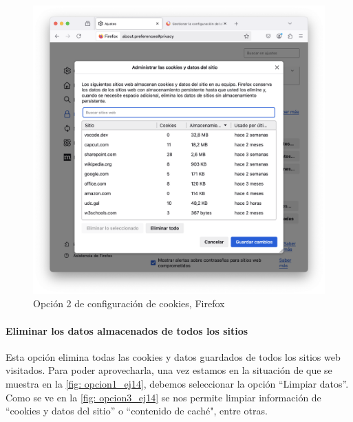 \begin{figure}[H]   
    \includegraphics[width=15cm]{opcion2_ej14.png}
    \caption{Opción 2 de configuración de cookies, Firefox}
    \label{fig:opcion2_ej14}
\end{figure}

\paragraph{Eliminar los datos almacenados de todos los sitios}

Esta opción elimina todas las cookies y datos guardados de todos los sitios web visitados. Para poder aprovecharla, una vez estamos en la situación de que se muestra en la \ref{fig: opcion1_ej14}, debemos seleccionar la opción “Limpiar datos”. Como se ve en la \ref{fig: opcion3_ej14} se nos permite limpiar información de “cookies y datos del sitio” o “contenido de caché", entre otras. 

